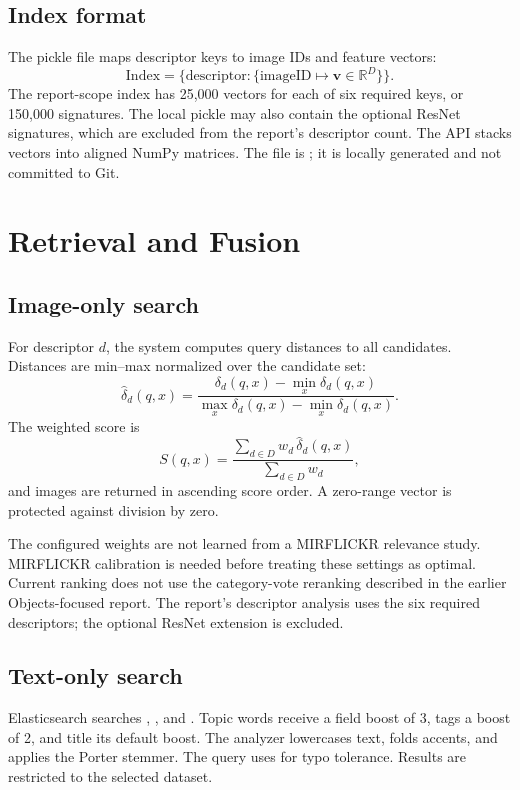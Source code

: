 \documentclass[12pt,a4paper]{article}
\begin{document}
\subsection{Index format}
The pickle file maps descriptor keys to image IDs and feature vectors:
\[
\mathrm{Index}=\{\mathrm{descriptor}:
\{\mathrm{imageID}\mapsto\mathbf{v}\in\mathbb{R}^{D}\}\}.
\]
The report-scope index has 25,000 vectors for each of six required keys, or
150,000 signatures. The local pickle may also contain the optional ResNet
signatures, which are excluded from the report's descriptor count. The API
stacks vectors into aligned NumPy matrices. The file is
; it is locally generated and not committed to Git.

\section{Retrieval and Fusion}
\subsection{Image-only search}
For descriptor $d$, the system computes query distances to all candidates.
Distances are min--max normalized over the candidate set:
\[
\widehat{\delta}_d(q,x)=
\frac{\delta_d(q,x)-\min_x\delta_d(q,x)}
{\max_x\delta_d(q,x)-\min_x\delta_d(q,x)}.
\]
The weighted score is
\[
S(q,x)=\frac{\sum_{d\in D}w_d\,\widehat{\delta}_d(q,x)}
{\sum_{d\in D}w_d},
\]
and images are returned in ascending score order. A zero-range vector is
protected against division by zero.

The configured weights are not learned from a MIRFLICKR relevance study.
MIRFLICKR calibration is needed before treating these settings as optimal.
Current ranking does not use the category-vote reranking described in the
earlier Objects-focused report. The report's descriptor analysis uses the six
required descriptors; the optional ResNet extension is excluded.

\subsection{Text-only search}
Elasticsearch searches , , and .
Topic words receive a field boost of 3, tags a boost of 2, and title its default
boost. The analyzer lowercases text, folds accents, and applies the Porter
stemmer. The query uses  for typo tolerance. Results
are restricted to the selected dataset.
\end{document}
